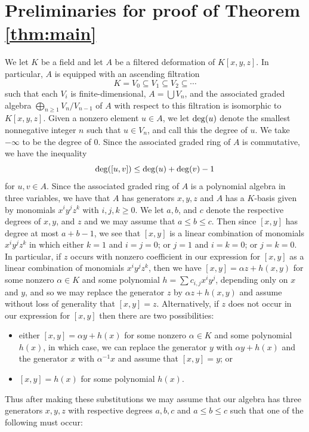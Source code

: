 \documentclass[a4paper,11pt,twoside,notitlepage,reqno]{amsart}
\theoremstyle{plain}
\numberwithin{thm}{section}
\theoremstyle{definition}
\begin{document}
\section{Preliminaries for proof of Theorem \ref{thm:main}}\label{sec:prelim}
We let $K$ be a field and let $A$ be a filtered deformation of $K[x,y,z]$.  In particular, $A$ is equipped with an ascending filtration 
$$K=V_0\subseteq V_1\subseteq V_2\subseteq \cdots$$ such that each $V_i$ is finite-dimensional, $A=\bigcup V_n$, and the associated graded algebra $\bigoplus_{n\ge 1} V_n/V_{n-1}$ of $A$ with respect to this filtration is isomorphic to $K[x,y,z]$.  Given a nonzero element $u\in A$, we let ${\rm deg}(u)$ denote the smallest nonnegative integer $n$ such that $u\in V_n$, and call this the degree of $u$.  We take $-\infty$ to be the degree of $0$.  Since the associated graded ring of $A$ is commutative, we have the inequality
$${\rm deg}([u,v])\le {\rm deg}(u)+{\rm deg}(v)-1$$ for $u,v\in A$.  Since the associated graded ring of $A$ is a polynomial algebra in three variables, we have that $A$ has generators $x,y,z$ and $A$ has a $K$-basis given by monomials $x^i y^j z^k$ with $i,j,k\ge 0$.  We let $a,b$, and $c$ denote the respective degrees of $x,y$, and $z$ and we may assume that $a\le b\le c$.  Then since $[x,y]$ has degree at most $a+b-1$, we see that $[x,y]$ is a linear combination of monomials $x^i y^j z^k$ in which either $k=1$ and $i=j=0$; or $j=1$ and $i=k=0$; or $j=k=0$.  In particular, if $z$ occurs with nonzero coefficient in our expression for $[x,y]$ as a linear combination of monomials $x^i y^j z^k$, then we have
$[x,y]=\alpha z+h(x,y)$ for some nonzero $\alpha\in K$ and some polynomial $h=\sum c_{i,j} x^i y^j$, depending only on $x$ and $y$, and so we may replace the generator $z$ by $\alpha z+h(x,y)$ and assume without loss of generality that $[x,y]=z$.
Alternatively, if $z$ does not occur in our expression for $[x,y]$ then there are two possibilities:
\begin{itemize}
\item either $[x,y]=\alpha y+h(x)$ for some nonzero $\alpha\in K$ and some polynomial $h(x)$, in which case, we can replace the generator $y$ with $\alpha y+h(x)$ and the generator $x$ with $\alpha^{-1} x$ and assume that $[x,y]=y$; or
\item $[x,y]=h(x)$ for some polynomial $h(x)$.
\end{itemize}
Thus after making these substitutions we may assume that our algebra has three generators $x,y,z$ with respective degrees $a,b,c$ and $a\le b\le c$ such that one of the following must occur:
\end{document}
